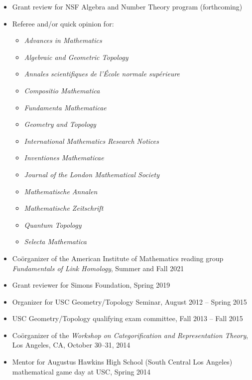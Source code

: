 \documentclass[10pt]{article}
\begin{document}
\begin{itemize}

\item Grant review for NSF Algebra and Number Theory program (forthcoming)

\item Referee and/or quick opinion for:
\begin{itemize}
\item {\it Advances in Mathematics} 
\item {\it Algebraic and Geometric Topology} 
\item {\it Annales scientifiques de l'\'{E}cole normale sup\'{e}rieure}
\item {\it Compositio Mathematica}
\item {\it Fundamenta Mathematicae}
\item {\it Geometry and Topology}
\item {\it International Mathematics Research Notices}
\item {\it Inventiones Mathematicae}
\item {\it Journal of the London Mathematical Society}
\item {\it Mathematische Annalen}
\item {\it Mathematische Zeitschrift}
\item {\it Quantum Topology}
\item {\it Selecta Mathematica}
\end{itemize}

\item Co\"{o}rganizer of the American Institute of Mathematics reading group \emph{Fundamentals of Link Homology},
Summer and Fall 2021

\item Grant reviewer for Simons Foundation, Spring 2019

\item Organizer for USC Geometry/Topology Seminar, August 2012 -- Spring 2015

\item USC Geometry/Topology qualifying exam committee, Fall 2013 -- Fall 2015

\item Co\"{o}rganizer of the \emph{Workshop on Categorification and Representation Theory},
Los Angeles, CA, October 30--31, 2014

\item Mentor for Augustus Hawkins High School (South Central Los Angeles) mathematical game day at USC, Spring 2014


\end{itemize}
\end{document}
